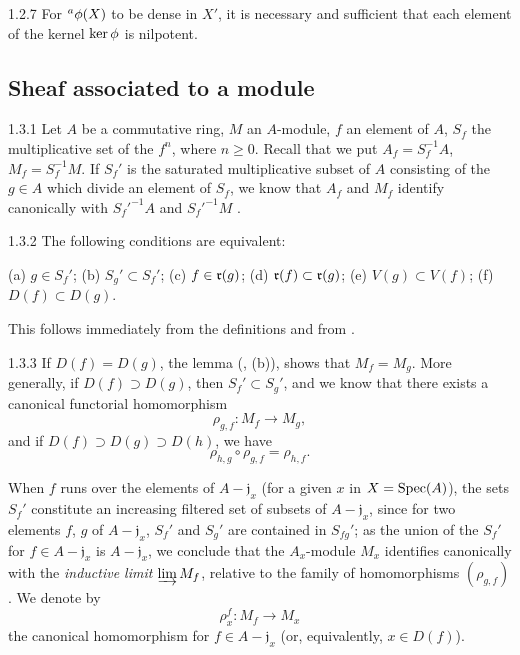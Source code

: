 \documentclass[10pt,oneside]{book}
\begin{document}
\begin{envs}[Corollary]{1.2.7}
\label{cor-1.1.2.7}
For $^a\phi(X)$ to be dense in $X'$, it is necessary and sufficient that each element
of the kernel $\ker\phi$ is nilpotent.
\end{envs}

\subsection{Sheaf associated to a module}
\label{1-schemes-1.3}

\begin{env}{1.3.1}
\label{env-1.1.3.1}
Let $A$ be a commutative ring, $M$ an $A$-module, $f$ an element of $A$, $S_f$ the
multiplicative set of the $f^n$, where $n\geqslant 0$. Recall that we put $A_f=S_f^{-1}A$,
$M_f=S_f^{-1}M$. If $S_f'$ is the saturated multiplicative subset of $A$ consisting of the
$g\in A$ which divide an element of $S_f$, we know that $A_f$ and $M_f$ identify canonically
with ${S_f'}^{-1}A$ and ${S_f'}^{-1}M$ .
\end{env}

\begin{envs}[Lemma]{1.3.2}
\label{lem-1.1.3.2}
The following conditions are equivalent:
\begin{center}
\rm{(a)} $g\in S_f'$;
\rm{(b)} $S_g'\subset S_f'$;
\rm{(c)} $f\in\mathfrak{r}(g)$;
\rm{(d)} $\mathfrak{r}(f)\subset\mathfrak{r}(g)$;
\rm{(e)} $V(g)\subset V(f)$;
\rm{(f)} $D(f)\subset D(g)$.
\end{center}
\end{envs}
This follows immediately from the definitions and from .

\begin{env}{1.3.3}
\label{env-1.1.3.3}
If $D(f)=D(g)$, the lemma (, (b)), shows that $M_f=M_g$. More generally, if
$D(f)\supset D(g)$, then $S_f'\subset S_g'$, and we know  that there exists
a canonical functorial homomorphism
\[
  \rho_{g,f}:M_f\longrightarrow M_g,
\]
and if $D(f)\supset D(g)\supset D(h)$, we have 
\[
  \rho_{h,g}\circ\rho_{g,f}=\rho_{h,f}.
  \tag{1.3.3.1}
\]
\end{env}

When $f$ runs over the elements of $A-\mathfrak{j}_x$ (for a given $x$ in $X={\mathop{\mathrm{Spec}}\nolimits}(A)$), the
sets $S_f'$ constitute an increasing filtered set of subsets of $A-\mathfrak{j}_x$, since for
two elements $f$, $g$ of $A-\mathfrak{j}_x$, $S_f'$ and $S_g'$ are contained in $S_{fg}'$; as
the union of the $S_f'$ for $f\in A-\mathfrak{j}_x$ is $A-\mathfrak{j}_x$, we conclude
 that the $A_x$-module $M_x$ identifies canonically with the \emph{inductive
limit} $\varinjlim M_f$, relative to the family of homomorphisms $(\rho_{g,f})$. We denote
by
\[
  \rho_x^f:M_f\longrightarrow M_x
\]
the canonical homomorphism for $f\in A-\mathfrak{j}_x$ (or, equivalently, $x\in D(f)$).
\end{document}
